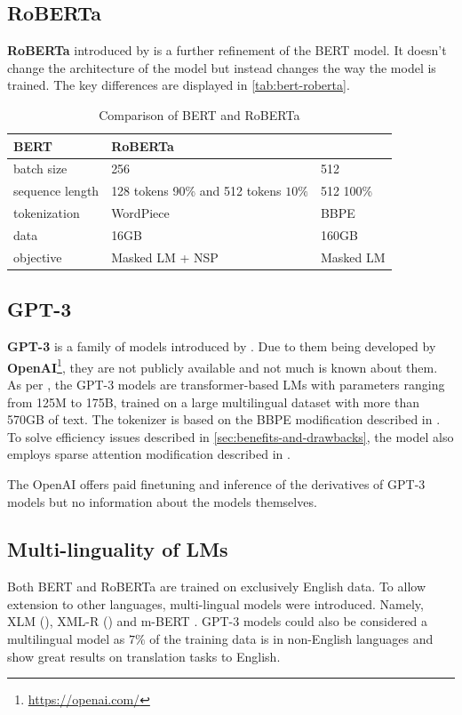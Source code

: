 \subsection{RoBERTa}
\textbf{RoBERTa} introduced by \cite{liuRoBERTaRobustlyOptimized2019} is a further refinement of the BERT model.
It doesn't change the architecture of the model but instead changes the way the model is trained.
The key differences are displayed in \autoref{tab:bert-roberta}.
\begin{table}[h]
    \centering\footnotesize\sf
    \begin{tabular}{lll}
        \toprule
        {} BERT & RoBERTa \\
        \midrule
        batch size & 256 & 512 \\
        sequence length & 128 tokens 90\% and 512 tokens $10\%$ & 512 100\% \\
        tokenization & WordPiece & BBPE \\
        data & 16GB & 160GB \\
        objective & Masked LM + NSP & Masked LM \\
        \bottomrule
    \end{tabular}
    \caption{Comparison of BERT and RoBERTa}
    \label{tab:bert-roberta}
\end{table}

\subsection{GPT-3}
\textbf{GPT-3} is a family of models introduced by \cite{brownLanguageModelsAre2020b}.
Due to them being developed by \textbf{OpenAI}\footnote{\url{https://openai.com/}}, they are not publicly available and not much is known about them.
As per \cite{brownLanguageModelsAre2020b}, the GPT-3 models are transformer-based LMs with parameters ranging from 125M to 175B, trained on
a large multilingual dataset with more than 570GB of text. The tokenizer is based on the BBPE modification described in \cite{radfordLanguageModelsArea}.
To solve efficiency issues described in \autoref{sec:benefits-and-drawbacks}, the model also employs sparse attention modification described in \cite{childGeneratingLongSequences2019}.

The OpenAI offers paid finetuning and inference of the derivatives of GPT-3 models but no information about the models themselves.

\subsection{Multi-linguality of LMs}
\label{sec:multilinguality}
Both BERT and RoBERTa are trained on exclusively English data. To allow extension to other languages,
multi-lingual models were introduced. Namely, XLM (\cite{lampleCrosslingualLanguageModel2019}), XML-R (\cite{conneauUnsupervisedCrosslingualRepresentation2020})
and m-BERT . GPT-3 models could also be considered a multilingual model as $7\%$ of the training data is in non-English languages
and show great results on translation tasks to English.

